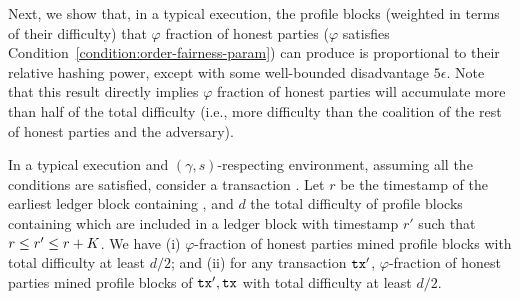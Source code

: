 Next, we show that, in a typical execution, the profile blocks (weighted in terms of their difficulty) that $\varphi$ fraction of honest parties ($\varphi$ satisfies Condition~\eqref{condition:order-fairness-param}) can produce is proportional to their relative hashing power, except with some well-bounded disadvantage $5\epsilon$.
%
Note that this result directly implies $\varphi$ fraction of honest parties will accumulate more than half of the total difficulty (i.e., more difficulty than the coalition of the rest of honest parties and the adversary).

\begin{lemma} \label{lemma:honest-tb-majority}
    In a typical execution and $(\gamma, s)$-respecting environment, assuming all the conditions are satisfied, consider a transaction \tx.
    Let $r$ be the timestamp of the earliest ledger block containing \tx, and $d$ the total difficulty of profile blocks containing \tx which are included in a ledger block with timestamp $r'$ such that $r \le r' \le r + K$.
    We have (i) $\varphi$-fraction of honest parties mined profile blocks with total difficulty at least $d / 2$; and (ii) for any transaction $\mathtt{tx}'$, $\varphi$-fraction of honest parties mined profile blocks of $\mathtt{tx}', \mathtt{tx}$ with total difficulty at least $d / 2$.
\end{lemma}

